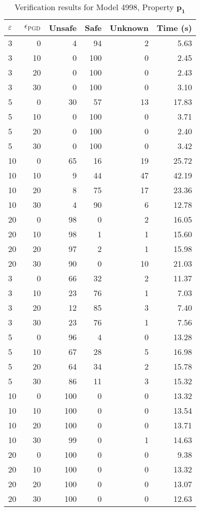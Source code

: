 \begin{table}[htbp]
\centering
\caption{Verification results for Model 4998, Property $\mathbf{p_{1}}$}
\label{tab:model4998_r1_part5}
\begin{tabular}{lrrrrr}
\toprule
$\varepsilon$ & $\epsilon_{\scriptscriptstyle\mathrm{PGD}}$ & Unsafe & Safe & Unknown & Time (s) \\
\midrule
3 & 0 & 4 & 94 & 2 & 5.63 \\
3 & 10 & 0 & 100 & 0 & 2.45 \\
3 & 20 & 0 & 100 & 0 & 2.43 \\
3 & 30 & 0 & 100 & 0 & 3.10 \\
5 & 0 & 30 & 57 & 13 & 17.83 \\
5 & 10 & 0 & 100 & 0 & 3.71 \\
5 & 20 & 0 & 100 & 0 & 2.40 \\
5 & 30 & 0 & 100 & 0 & 3.42 \\
10 & 0 & 65 & 16 & 19 & 25.72 \\
10 & 10 & 9 & 44 & 47 & 42.19 \\
10 & 20 & 8 & 75 & 17 & 23.36 \\
10 & 30 & 4 & 90 & 6 & 12.78 \\
20 & 0 & 98 & 0 & 2 & 16.05 \\
20 & 10 & 98 & 1 & 1 & 15.60 \\
20 & 20 & 97 & 2 & 1 & 15.98 \\
20 & 30 & 90 & 0 & 10 & 21.03 \\
3 & 0 & 66 & 32 & 2 & 11.37 \\
3 & 10 & 23 & 76 & 1 & 7.03 \\
3 & 20 & 12 & 85 & 3 & 7.40 \\
3 & 30 & 23 & 76 & 1 & 7.56 \\
5 & 0 & 96 & 4 & 0 & 13.28 \\
5 & 10 & 67 & 28 & 5 & 16.98 \\
5 & 20 & 64 & 34 & 2 & 15.78 \\
5 & 30 & 86 & 11 & 3 & 15.32 \\
10 & 0 & 100 & 0 & 0 & 13.32 \\
10 & 10 & 100 & 0 & 0 & 13.54 \\
10 & 20 & 100 & 0 & 0 & 13.71 \\
10 & 30 & 99 & 0 & 1 & 14.63 \\
20 & 0 & 100 & 0 & 0 & 9.38 \\
20 & 10 & 100 & 0 & 0 & 13.32 \\
20 & 20 & 100 & 0 & 0 & 13.07 \\
20 & 30 & 100 & 0 & 0 & 12.63 \\
\bottomrule
\end{tabular}
\end{table}
